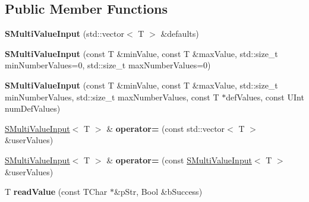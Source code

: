 \subsection*{Public Member Functions}
\begin{DoxyCompactItemize}
\item 
\mbox{\label{struct_s_multi_value_input_a1d51da5b6e07775d74a16da49a81cf39}} 
{\bfseries S\+Multi\+Value\+Input} (std\+::vector$<$ T $>$ \&defaults)
\item 
\mbox{\label{struct_s_multi_value_input_ab518921a1f698fa1afc0d3e502dc75b0}} 
{\bfseries S\+Multi\+Value\+Input} (const T \&min\+Value, const T \&max\+Value, std\+::size\+\_\+t min\+Number\+Values=0, std\+::size\+\_\+t max\+Number\+Values=0)
\item 
\mbox{\label{struct_s_multi_value_input_a99e7a8cf11af168bb068c7ea3c8d911a}} 
{\bfseries S\+Multi\+Value\+Input} (const T \&min\+Value, const T \&max\+Value, std\+::size\+\_\+t min\+Number\+Values, std\+::size\+\_\+t max\+Number\+Values, const T $\ast$def\+Values, const U\+Int num\+Def\+Values)
\item 
\mbox{\label{struct_s_multi_value_input_a3d82b11c0007cc82f4d1cdfd63da367a}} 
\hyperlink{struct_s_multi_value_input}{S\+Multi\+Value\+Input}$<$ T $>$ \& {\bfseries operator=} (const std\+::vector$<$ T $>$ \&user\+Values)
\item 
\mbox{\label{struct_s_multi_value_input_ac5ddfd798b753b8e4c0a49a608c8d9ad}} 
\hyperlink{struct_s_multi_value_input}{S\+Multi\+Value\+Input}$<$ T $>$ \& {\bfseries operator=} (const \hyperlink{struct_s_multi_value_input}{S\+Multi\+Value\+Input}$<$ T $>$ \&user\+Values)
\item 
\mbox{\label{struct_s_multi_value_input_a9c19e633f65d756d45e85799a62ff10a}} 
T {\bfseries read\+Value} (const T\+Char $\ast$\&p\+Str, Bool \&b\+Success)
\end{DoxyCompactItemize}
{\bf }\par
